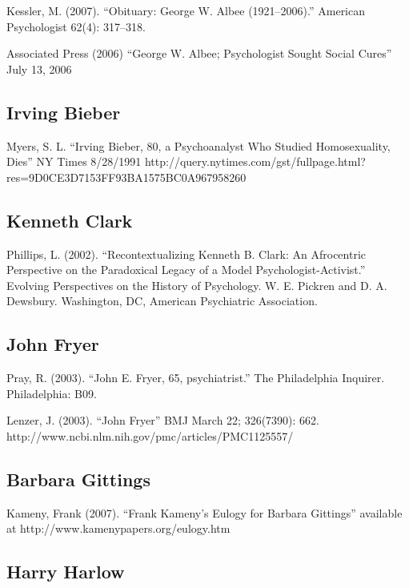 \begin{refsection}
\begin{appendices}
Kessler, M. (2007). ``Obituary: George W. Albee (1921--2006).'' American Psychologist 62(4): 317--318. 

Associated Press (2006) ``George W. Albee; Psychologist Sought Social Cures'' July 13, 2006

\subsection{Irving Bieber}
\label{irvingbieber}

Myers, S. L. ``Irving Bieber, 80, a Psychoanalyst Who Studied Homosexuality, Dies'' NY Times 8\slash 28\slash 1991 http:\slash \slash query.nytimes.com\slash gst\slash fullpage.html?res=9D0CE3D7153FF93BA1575BC0A967958260

\subsection{Kenneth Clark}
\label{kennethclark}

Phillips, L. (2002). ``Recontextualizing Kenneth B. Clark: An Afrocentric Perspective on the Paradoxical Legacy of a Model Psychologist-Activist.'' Evolving Perspectives on the History of Psychology. W. E. Pickren and D. A. Dewsbury. Washington, DC, American Psychiatric Association. 

\subsection{John Fryer}
\label{johnfryer}

Pray, R. (2003). ``John E. Fryer, 65, psychiatrist.'' The Philadelphia Inquirer. Philadelphia: B09.

Lenzer, J. (2003). ``John Fryer'' BMJ March 22; 326(7390): 662. http:\slash \slash www.ncbi.nlm.nih.gov\slash pmc\slash articles\slash PMC1125557\slash  

\subsection{Barbara Gittings}
\label{barbaragittings}

Kameny, Frank (2007). ``Frank Kameny's Eulogy for Barbara Gittings'' available at http:\slash \slash www.kamenypapers.org\slash eulogy.htm

\subsection{Harry Harlow}
\label{harryharlow}


\end{appendices}
\end{refsection}

